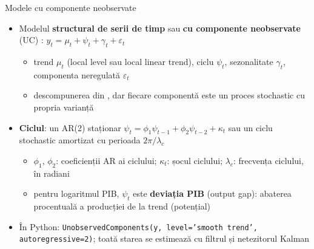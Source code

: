 \begin{frame}{Modele cu componente neobservate}
\itemsize{\small}
\begin{itemize}
    \item Modelul \textbf{structural de serii de timp} sau \textbf{cu componente neobservate} (UC) : $y_t = \mu_t + \psi_t + \gamma_t + \varepsilon_t$
    \begin{itemize}
        \item trend $\mu_t$ (local level sau local linear trend), ciclu $\psi_t$, sezonalitate $\gamma_t$, componenta neregulată $\varepsilon_t$
        \item descompunerea din , dar fiecare componentă este un proces stochastic cu propria varianță
    \end{itemize}
    \item \textbf{Ciclul}: un AR(2) staționar $\psi_t = \phi_1\psi_{t-1} + \phi_2\psi_{t-2} + \kappa_t$ sau un ciclu stochastic amortizat cu perioada $2\pi/\lambda_c$
    \begin{itemize}
        \item $\phi_1$, $\phi_2$: coeficienții AR ai ciclului; $\kappa_t$: șocul ciclului; $\lambda_c$: frecvența ciclului, în radiani
        \item pentru logaritmul PIB, $\psi_t$ este \textbf{deviația PIB} (output gap): abaterea procentuală a producției de la trend (potențial)
    \end{itemize}
    \item În Python: \texttt{UnobservedComponents(y, level='smooth trend', autoregressive=2)}; toată starea se estimează cu filtrul și netezitorul Kalman
\end{itemize}
\end{frame}

